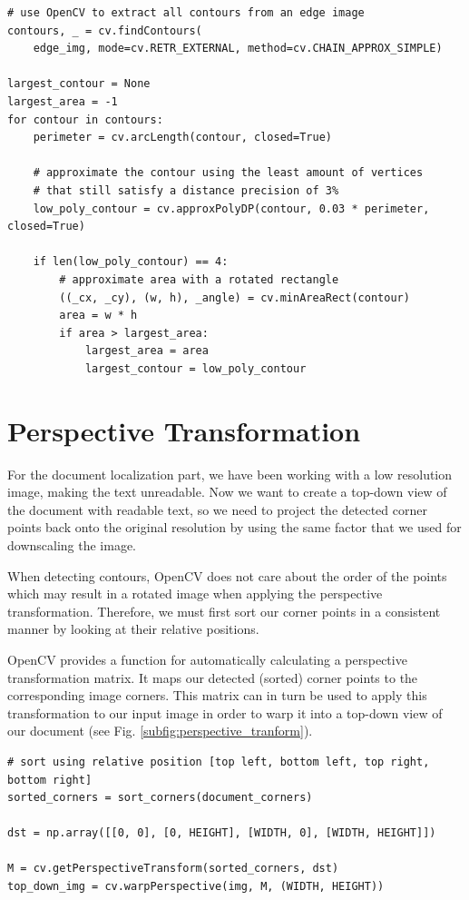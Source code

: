 \documentclass[bibliography=totoc]{scrartcl}
\begin{document}
\lstset{language=Python}
\lstset{frame=lines}
\lstset{basicstyle=\footnotesize}
\begin{lstlisting}
# use OpenCV to extract all contours from an edge image
contours, _ = cv.findContours(
	edge_img, mode=cv.RETR_EXTERNAL, method=cv.CHAIN_APPROX_SIMPLE)

largest_contour = None
largest_area = -1
for contour in contours:
	perimeter = cv.arcLength(contour, closed=True)
	
	# approximate the contour using the least amount of vertices 
	# that still satisfy a distance precision of 3%
	low_poly_contour = cv.approxPolyDP(contour, 0.03 * perimeter, closed=True)

	if len(low_poly_contour) == 4:
		# approximate area with a rotated rectangle
		((_cx, _cy), (w, h), _angle) = cv.minAreaRect(contour)
		area = w * h
		if area > largest_area:
			largest_area = area
			largest_contour = low_poly_contour
	\end{lstlisting}


\section{Perspective Transformation}
For the document localization part, we have been working with a low resolution image, making the text unreadable.
Now we want to create a top-down view of the document with readable text, so we need to project the detected corner points back onto the original resolution by using the same factor that we used for downscaling the image.

When detecting contours, OpenCV does not care about the order of the points which may result in a rotated image when applying the perspective transformation.
Therefore, we must first sort our corner points in a consistent manner by looking at their relative positions.

OpenCV provides a function for automatically calculating a perspective transformation matrix.
It maps our detected (sorted) corner points to the corresponding image corners.
This matrix can in turn be used to apply this transformation to our input image in order to warp it into a top-down view of our document (see Fig. \ref{subfig:perspective_tranform}).\\

\lstset{language=Python}
\lstset{frame=lines}
\lstset{basicstyle=\footnotesize}
\begin{lstlisting}
# sort using relative position [top left, bottom left, top right, bottom right]
sorted_corners = sort_corners(document_corners)

dst = np.array([[0, 0], [0, HEIGHT], [WIDTH, 0], [WIDTH, HEIGHT]])

M = cv.getPerspectiveTransform(sorted_corners, dst)
top_down_img = cv.warpPerspective(img, M, (WIDTH, HEIGHT))
	\end{lstlisting}
\end{document}
